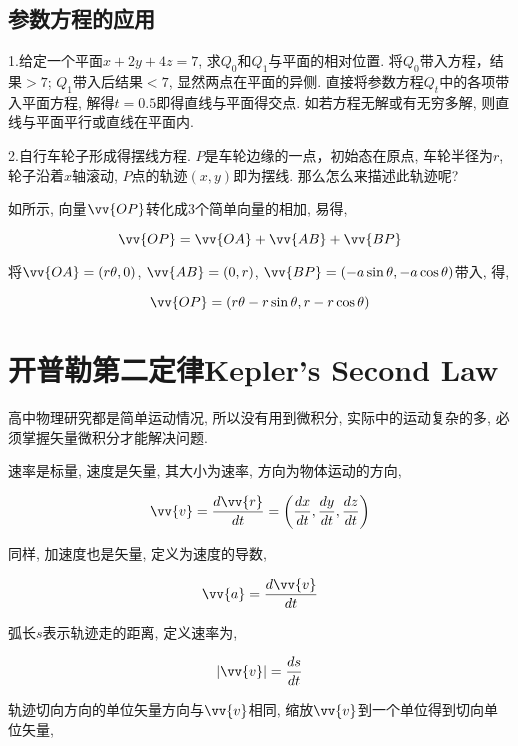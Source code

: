 \subsection{参数方程的应用}

1.给定一个平面$ x+2y+4z=7 $, 求$ Q_0 $和$ Q_1 $与平面的相对位置. 将$ Q_0 $带入方程，结果$ >7 $; $ Q_1 $带入后结果$ <7 $, 显然两点在平面的异侧. 直接将参数方程$ Q_t $中的各项带入平面方程, 解得$ t=0.5 $即得直线与平面得交点. 如若方程无解或有无穷多解, 则直线与平面平行或直线在平面内.

2.自行车轮子形成得摆线方程. $ P $是车轮边缘的一点，初始态在原点, 车轮半径为$ r $, 轮子沿着$ x $轴滚动, $ P $点的轨迹$ (x,y) $即为摆线. 那么怎么来描述此轨迹呢?

如所示, 向量$ \vv{OP} $转化成3个简单向量的相加, 易得,

\begin{equation}
\vv{OP}=\vv{OA}+\vv{AB}+\vv{BP}
\end{equation}

将$ \vv{OA}=(r\theta, 0) $, $ \vv{AB}=(0, r) $, $ \vv{BP}=(-a\sin\theta, -a\cos\theta) $带入, 得,

\begin{equation}
\vv{OP}=(r\theta-r\sin\theta, r-r\cos\theta)
\end{equation}

\section{开普勒第二定律Kepler's Second Law}

高中物理研究都是简单运动情况, 所以没有用到微积分, 实际中的运动复杂的多, 必须掌握矢量微积分才能解决问题.

速率是标量, 速度是矢量, 其大小为速率, 方向为物体运动的方向,

\begin{equation}
\vv{v}=\df{\vv{r}}{t}=\left( \df{x}{t}, \df{y}{t}, \df{z}{t} \right)
\end{equation}

同样, 加速度也是矢量, 定义为速度的导数,

\begin{equation}
\vv{a}=\df{\vv{v}}{t}
\end{equation}

弧长$ s $表示轨迹走的距离, 定义速率为,

\begin{equation}
|\vv{v}|=\df{s}{t}
\end{equation}

轨迹切向方向的单位矢量方向与$ \vv{v} $相同, 缩放$ \vv{v} $到一个单位得到切向单位矢量,


